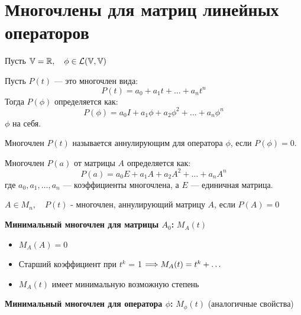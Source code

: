 \section{Многочлены для матриц линейных операторов}

Пусть $ \mathbb{V} = \mathbb{R}, \quad \phi \in \mathcal{L}(\mathbb{V},\mathbb{V})$


\begin{shdef}
\begin{definition}
\leavevmode \nl 

    Пусть $P(t)$ — это многочлен вида:
    \[
    P(t) = a_{0} + a_{1}t + \ldots + a_{n}t^n
    \]
    Тогда $P(\phi)$ определяется как:
    \[
    P(\phi) = a_{0}I + a_{1}\phi + a_{2}\phi^2 + \ldots + a_{n}\phi^n
    \]
     $\phi$ на себя.

    Многочлен $P(t)$ называется аннулирующим для оператора $\phi$, если $P(\phi) = 0$.
\end{definition}

\end{shdef}

\begin{shdef}
    \begin{definition}
    \leavevmode \nl 
    
    Многочлен \( P(a) \) от матрицы \( A \) определяется как:
    \[
    P(a) = a_{0} E + a_{1} A + a_{2} A^2 + \ldots + a_{n} A^n
    \]
    где \( a_0, a_1, \ldots, a_n \) — коэффициенты многочлена, а \( E \) — единичная матрица.
    
    
    \(A \in M_{n}, \quad P(t)\) - многочлен, аннулирующий матрицу $ A$, если \(P(A) = 0\)
\end{definition}
\end{shdef}

\clearpage
\begin{shdef}
    \begin{definition}
    \leavevmode \nl 
    
        \textbf{Минимальный многочлен для матрицы \(A_0\):} \(M_{A}(t)\) \\
        \begin{itemize}
            \item \(M_{A}(A) = 0\)
            \item Старший коэффициент при $ t^k $ = 1 \; $ \Longrightarrow M_{A}(t) = t^k + \ldots $ 
            \item \(M_{A}(t)\) имеет минимальную возможную степень
        \end{itemize}
        
        \textbf{Минимальный многочлен для оператора \(\phi\):} \(M_{\phi}(t)\) (аналогичные свойства)
    \end{definition}
\end{shdef}


